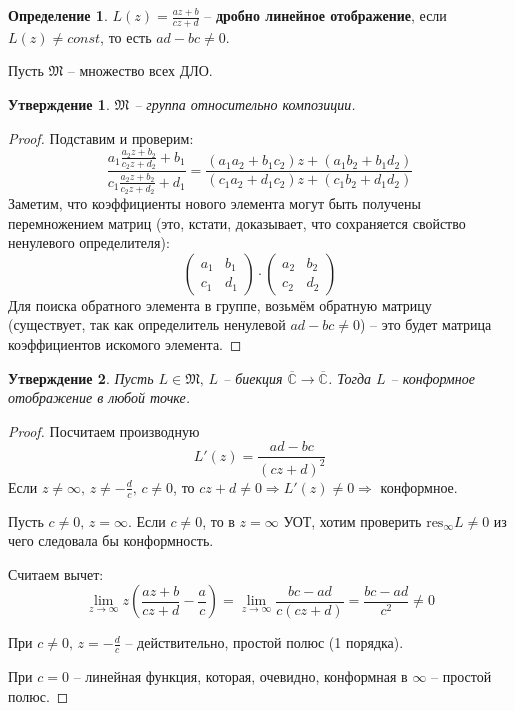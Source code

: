 \documentclass[a4paper,12pt]{article}
\theoremstyle{plain}
\newtheorem{proposition}{Утверждение}[section]
\theoremstyle{definition}
\newtheorem{definition}{Определение}[section]
\theoremstyle{remark}
\begin{document}
\begin{definition}
	$L(z) = \frac{az + b}{cz + d}$ -- \textbf{дробно линейное отображение}, если $L(z) \neq const$, то есть $ad - bc \neq 0$.

	Пусть $\mathfrak{M}$ -- множество всех ДЛО.
\end{definition}

\begin{proposition}
	$\mathfrak{M}$ -- группа относительно композиции.
\end{proposition}

\begin{proof}
	Подставим и проверим:
	\[
		\frac{a_1\frac{a_2z + b_2}{c_2z + d_2} + b_1}{c_1\frac{a_2z + b_2}{c_2z + d_2} + d_1} = \frac{(a_1a_2 + b_1c_2)z + (a_1b_2 + b_1d_2)}{(c_1a_2 + d_1c_2)z + (c_1b_2 + d_1d_2)}
	\]
	Заметим, что коэффициенты нового элемента могут быть получены перемножением матриц (это, кстати, доказывает, что сохраняется свойство ненулевого определителя):
	\[
		\begin{pmatrix}
			a_1 & b_1 \\
			c_1 & d_1
		\end{pmatrix}
		\cdot
		\begin{pmatrix}
			a_2 & b_2 \\
			c_2 & d_2
		\end{pmatrix}
	\]
	Для поиска обратного элемента в группе, возьмём обратную матрицу (существует, так как определитель ненулевой $ad - bc \neq 0$) -- это будет матрица коэффициентов искомого элемента.
\end{proof}

\begin{proposition}
	Пусть $L \in \mathfrak{M},\, L$ -- биекция $\overline{\mathbb{C}} \to \overline{\mathbb{C}}$. Тогда $L$ -- конформное отображение в любой точке.
\end{proposition}

\begin{proof}
	Посчитаем производную
	\[
		L'(z) = \frac{ad - bc}{(cz + d)^2}
	\]
	Если $z \neq \infty,\, z \neq -\frac{d}{c},\, c \neq 0$, то $cz + d \neq 0 \Rightarrow L'(z) \neq 0 \Rightarrow$ конформное.

	Пусть $c \neq 0,\, z = \infty$. Если $c \neq 0$, то в $z = \infty$ УОТ, хотим проверить $\text{res}_\infty L \neq 0$ из чего следовала бы конформность.

	Считаем вычет:
	\[
		\lim_{z \to \infty} z\left(\frac{az + b}{cz + d} - \frac{a}{c}\right) = \lim_{z \to \infty} \frac{bc - ad}{c(cz + d)} = \frac{bc - ad}{c^2} \neq 0
	\]

	При $c \neq 0,\, z = -\frac{d}{c}$ -- действительно, простой полюс (1 порядка).

	При $c = 0$ -- линейная функция, которая, очевидно, конформная в $\infty$ -- простой полюс.
\end{proof}
\end{document}

